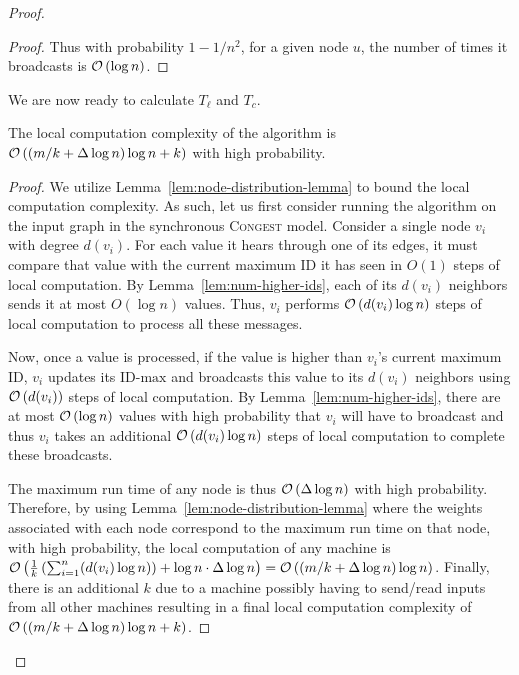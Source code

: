 \begin{proof}
\begin{proof}
    Thus with probability $1 - 1/n^2$, for a given node $u$, the number of times it broadcasts is $\mathcal{O}\left(\log n\right)$. 
    \end{proof}
    
    
    We are now ready to calculate $T_{\ell}$ and $T_c$.
    \begin{lemma}
    The local computation complexity of the algorithm is $\mathcal{O}\left((m/k + \Delta\log n) \log n + k\right)$ with high probability.
    \end{lemma}
    
    \begin{proof}
    
    We utilize Lemma~\ref{lem:node-distribution-lemma} to bound the local computation complexity. As such, let us first consider running the algorithm on the input graph in the synchronous \textsc{Congest} model. Consider a single node $v_i$ with degree $d(v_i)$. For each value it hears through one of its edges, it must compare that value with the current maximum ID it has seen in $O(1)$ steps of local computation. By Lemma~\ref{lem:num-higher-ids}, each of its $d(v_i)$ neighbors sends it at most $O(\log n)$ values. Thus, $v_i$ performs $\mathcal{O}\left(d(v_i) \log n\right)$ steps of local computation to process all these messages.
    
    Now, once a value is processed, if the value is higher than $v_i$'s current maximum ID, $v_i$ updates its $\textrm{ID-max}$ and broadcasts this value to its $d(v_i)$ neighbors using $\mathcal{O}\left(d(v_i)\right)$ steps of local computation. By Lemma~\ref{lem:num-higher-ids}, there are at most $\mathcal{O}\left(\log n\right)$ values with high probability that $v_i$ will have to broadcast and thus $v_i$ takes an additional $\mathcal{O}\left(d(v_i) \log n\right)$ steps of local computation to complete these broadcasts.
    
	The maximum run time of any node is thus $\mathcal{O}\left(\Delta \log n\right)$ with high probability. Therefore, by using Lemma~\ref{lem:node-distribution-lemma} where the weights associated with each node correspond to the maximum run time on that node, with high probability, the local computation of any machine is $\mathcal{O}\left(\frac{1}{k}\left(\sum_{i=1}^n (d(v_i) \log n)\right) + \log n \cdot \Delta \log n\right) = \mathcal{O}\left((m / k + \Delta \log n) \log n\right)$. Finally, there is an additional $k$ due to a machine possibly having to send/read inputs from all other machines resulting in a final local computation complexity of $\mathcal{O}\left((m / k + \Delta \log n) \log n + k\right)$.
    \end{proof}
    

\end{proof}
